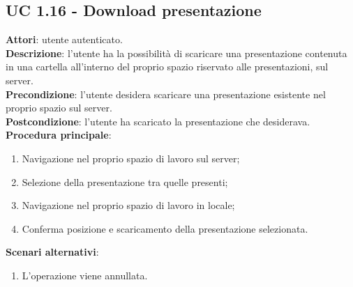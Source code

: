 \subsection{UC 1.16 - Download presentazione}{
	\label{uc1.16}
	\textbf{Attori}: utente autenticato.	\\
	\textbf{Descrizione}: l'utente ha la possibilità di scaricare una presentazione contenuta in una cartella all'interno del proprio spazio riservato alle presentazioni, sul server. \\
	\textbf{Precondizione}: l'utente desidera scaricare una presentazione esistente nel proprio spazio sul server.	\\
	\textbf{Postcondizione}: l'utente ha scaricato la presentazione che desiderava.	\\
	\textbf{Procedura principale}:
	\begin{enumerate}
		\item Navigazione nel proprio spazio di lavoro sul server;
		\item Selezione della presentazione tra quelle presenti;
		\item Navigazione nel proprio spazio di lavoro in locale;
		\item Conferma posizione e scaricamento della presentazione selezionata.
	\end{enumerate}
	\textbf{Scenari alternativi}: 
	\begin{enumerate}
		\item L'operazione viene annullata.
	\end{enumerate}
	}